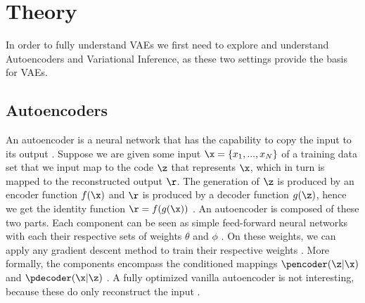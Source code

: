 \chapter{Theory} \label{ch:theory}
In order to fully understand VAEs we first need to explore and understand Autoencoders and Variational Inference, as these two settings provide the basis for VAEs. 
\section{Autoencoders}
An autoencoder is a neural network that has the capability to copy the input to its output \cite[Chp.~14]{Goodfellow-et-al-2016}. Suppose we are given some input $\x = \{x_1, ..., x_N\}$ of a training data set that we input map to the code $\z$ that represents $\x$, which in turn is mapped to the reconstructed output $\r$. The generation of $\z$ is produced by an encoder function $f(\x)$ and $\r$ is produced by a decoder function $g(\z)$, hence we get the identity function $\r = f(g(\x))$ \cite[Chp.~14]{Goodfellow-et-al-2016}. An autoencoder is composed of these two parts. Each component can be seen as simple feed-forward neural networks with each their respective sets of weights $\theta$ and $\phi$  \cite[Chp.~14]{Goodfellow-et-al-2016}. On these weights, we can apply any gradient descent method to train their respective weights \cite[Chp.~14]{Goodfellow-et-al-2016}. More formally, the components encompass the conditioned mappings $\pencoder(\z|\x)$ and $\pdecoder(\x|\z)$ \cite[Chp.~14]{Goodfellow-et-al-2016}. A fully optimized vanilla autoencoder is not interesting, because these do only reconstruct the input \cite[Chp.~14]{Goodfellow-et-al-2016}. \\

